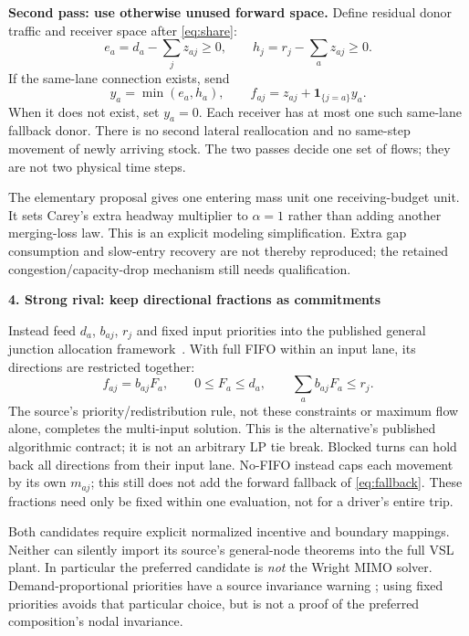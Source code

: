 \documentclass[10pt,a4paper]{article}
\newcommand{\head}[1]{\par\medskip\textbf{#1}\par}
\begin{document}
\textbf{Second pass: use otherwise unused forward space.}
Define residual donor traffic and receiver space after \eqref{eq:share}:
\begin{equation}
 e_a=d_a-\sum_jz_{aj}\geq0,\qquad
 h_j=r_j-\sum_az_{aj}\geq0. \label{eq:residuals}
\end{equation}
If the same-lane connection exists, send
\begin{equation}
 y_a=\min(e_a,h_a),\qquad
 f_{aj}=z_{aj}+\mathbf1_{\{j=a\}}y_a. \label{eq:fallback}
\end{equation}
When it does not exist, set $y_a=0$. Each receiver has at most one such
same-lane fallback donor. There is no second lateral reallocation and no
same-step movement of newly arriving stock. The two passes decide one set
of flows; they are not two physical time steps.

The elementary proposal gives one entering mass unit one receiving-budget
unit. It sets Carey's extra headway multiplier to $\alpha=1$ rather than
adding another merging-loss law. This is an explicit modeling simplification.
Extra gap consumption and slow-entry recovery are not thereby reproduced;
the retained congestion/capacity-drop mechanism still needs qualification.

\head{4. Strong rival: keep directional fractions as commitments}
Instead feed $d_a$, $b_{aj}$, $r_j$ and fixed input priorities into the
published general junction allocation framework~\cite{wright}. With full
FIFO within an input lane, its directions are restricted together:
\begin{equation}
 f_{aj}=b_{aj}F_a,\qquad 0\leq F_a\leq d_a,
 \qquad \sum_a b_{aj}F_a\leq r_j. \label{eq:fifo}
\end{equation}
The source's priority/redistribution rule, not these constraints or maximum
flow alone, completes the multi-input solution. This is the alternative's
published algorithmic contract; it is not an arbitrary LP tie break.
Blocked turns can hold back all directions from their input lane. No-FIFO
instead caps each movement by its own $m_{aj}$; this still does not add the
forward fallback of \eqref{eq:fallback}. These fractions need only be fixed
within one evaluation, not for a driver's entire trip.

Both candidates require explicit normalized incentive and boundary mappings.
Neither can silently import its source's general-node theorems into the full
VSL plant. In particular the preferred candidate is \emph{not} the Wright
MIMO solver. Demand-proportional priorities have a source invariance warning
\cite[Remark 3.1]{wright}; using fixed priorities avoids that particular
choice, but is not a proof of the preferred composition's nodal invariance.
\end{document}
